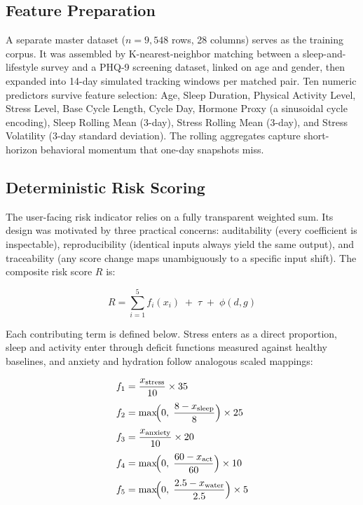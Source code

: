 \documentclass[conference]{IEEEtran}
\begin{document}
\subsection{Feature Preparation}
A separate master dataset ($n = 9{,}548$ rows, 28 columns) serves as the training corpus. It was assembled by K-nearest-neighbor matching between a sleep-and-lifestyle survey and a PHQ-9 screening dataset, linked on age and gender, then expanded into 14-day simulated tracking windows per matched pair. Ten numeric predictors survive feature selection: Age, Sleep Duration, Physical Activity Level, Stress Level, Base Cycle Length, Cycle Day, Hormone Proxy (a sinusoidal cycle encoding), Sleep Rolling Mean (3-day), Stress Rolling Mean (3-day), and Stress Volatility (3-day standard deviation). The rolling aggregates capture short-horizon behavioral momentum that one-day snapshots miss.

\subsection{Deterministic Risk Scoring}
The user-facing risk indicator relies on a fully transparent weighted sum. Its design was motivated by three practical concerns: auditability (every coefficient is inspectable), reproducibility (identical inputs always yield the same output), and traceability (any score change maps unambiguously to a specific input shift). The composite risk score $R$ is:

\begin{equation}
R = \sum_{i=1}^{5} f_i(x_i) \;+\; \tau \;+\; \phi(d, g)
\label{eq:risk}
\end{equation}

Each contributing term is defined below. Stress enters as a direct proportion, sleep and activity enter through deficit functions measured against healthy baselines, and anxiety and hydration follow analogous scaled mappings:

\begin{align}
f_1 &= \frac{x_{\text{stress}}}{10} \times 35 \label{eq:f1}\\[3pt]
f_2 &= \max\!\Bigl(0,\;\frac{8 - x_{\text{sleep}}}{8}\Bigr) \times 25 \label{eq:f2}\\[3pt]
f_3 &= \frac{x_{\text{anxiety}}}{10} \times 20 \label{eq:f3}\\[3pt]
f_4 &= \max\!\Bigl(0,\;\frac{60 - x_{\text{act}}}{60}\Bigr) \times 10 \label{eq:f4}\\[3pt]
f_5 &= \max\!\Bigl(0,\;\frac{2.5 - x_{\text{water}}}{2.5}\Bigr) \times 5 \label{eq:f5}
\end{align}
\end{document}

